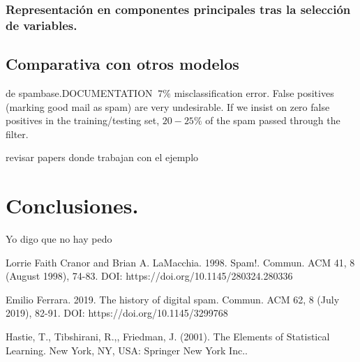 \documentclass[12pt, letterpaper]{article}
\begin{document}
\subsubsection{Representación en componentes principales tras la selección de variables.}

\subsection{Comparativa con otros modelos}

de spambase.DOCUMENTATION
$~7\%$ misclassification error.
False positives (marking good mail as spam) are very undesirable.
If we insist on zero false positives in the training/testing set,
$20-25\%$ of the spam passed through the filter.

revisar papers donde trabajan con el ejemplo

\section{Conclusiones.}
Yo digo que no hay pedo

\begin{thebibliography}{1}

Lorrie Faith Cranor and Brian A. LaMacchia. 1998. Spam!. Commun. ACM 41, 8 (August 1998), 74-83. DOI: https://doi.org/10.1145/280324.280336

Emilio Ferrara. 2019. The history of digital spam. Commun. ACM 62, 8 (July 2019), 82-91. DOI: https://doi.org/10.1145/3299768

Hastie, T., Tibshirani, R.,, Friedman, J. (2001). The Elements of Statistical Learning. New York, NY, USA: Springer New York Inc.. 

\end{thebibliography}
\end{document}
